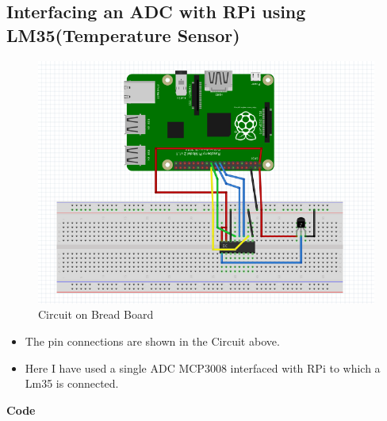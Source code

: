 \documentclass[11pt,a4paper]{article}
\begin{document}
\subsection{Interfacing an ADC with RPi using LM35(Temperature Sensor)}
\newpage
		\begin{figure}[h!]
		\includegraphics[scale=0.7]{lm35_interfacing.jpg}
		\centering
		\caption{Circuit on Bread Board}
		\end{figure}
	\begin{itemize}
	\item The pin connections are shown in the Circuit above. 
	\item  Here I have used a single ADC MCP3008 interfaced with RPi to which a Lm35 is connected.
	\end{itemize} 
	\textbf{Code}
	\vspace{0.3cm}
	
		
\end{document}

